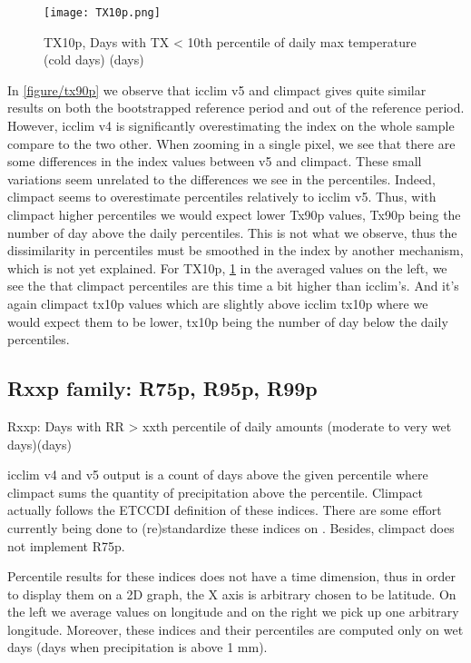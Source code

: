 \documentclass[a4paper,11pt]{article}
\begin{document}
            \begin{figure}[!hbt]
                \centering
                \texttt{[image: TX10p.png]}
                \caption{TX10p, Days with TX < 10th percentile of daily max temperature (cold days) (days)}
                \label{figure/tx10p}
            \end{figure}

            In \ref{figure/tx90p} we observe that icclim v5 and climpact gives quite similar results on both the bootstrapped reference period and out of the reference period.
            However, icclim v4 is significantly overestimating the index on the whole sample compare to the two other.
            When zooming in a single pixel, we see that there are some differences in the index values between v5 and climpact.
            These small variations seem unrelated to the differences we see in the percentiles.
            Indeed, climpact seems to overestimate percentiles relatively to icclim v5. Thus, with climpact higher percentiles we would expect lower Tx90p values, Tx90p being the number of day above the daily percentiles.
            This is not what we observe, thus the dissimilarity in percentiles must be smoothed in the index by another mechanism, which is not yet explained.
            For TX10p, \ref{figure/tx10p} in the averaged values on the left, we see the that climpact percentiles are this time a bit higher than icclim's.
            And it's again climpact tx10p values which are slightly above icclim tx10p where we would expect them to be lower, tx10p being the number of day below the daily percentiles.

        \subsection{Rxxp family: R75p, R95p, R99p}
            Rxxp: Days with RR > xxth percentile of daily amounts (moderate to very wet days)(days)

            icclim v4 and v5 output is a count of days above the given percentile where climpact sums the quantity of precipitation above the percentile. 
            Climpact actually follows the ETCCDI\cite{doc/etccdi} definition of these indices.
            There are some effort currently being done to (re)standardize these indices on \cite{gh/clixmeta}.
            Besides, climpact does not implement R75p.

            Percentile results for these indices does not have a time dimension, thus in order to display them on a 2D graph, the X axis is arbitrary chosen to be latitude.
            On the left we average values on longitude and on the right we pick up one arbitrary longitude.
            Moreover, these indices and their percentiles are computed only on wet days (days when precipitation is above 1 mm).
\end{document}
